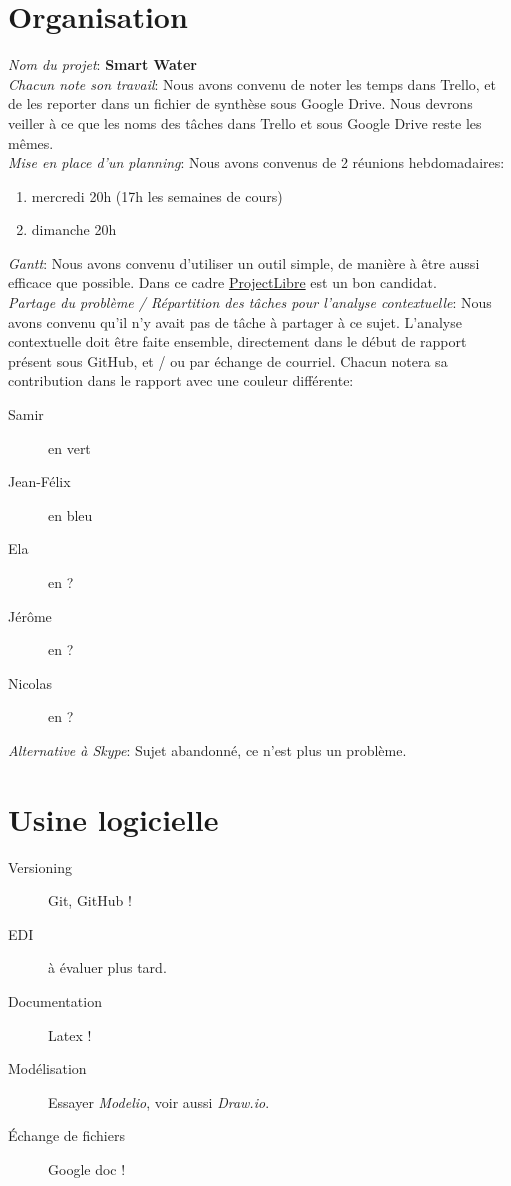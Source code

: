 \documentclass[11pt,a4paper,french,twoside,openright]{article}
\begin{document}
\section{Organisation}
\noindent
\emph{Nom du projet}: \textbf{Smart Water}\\
\emph{Chacun note son travail}: Nous avons convenu de noter les temps dans Trello, et de les reporter dans un fichier de synthèse sous Google Drive.
Nous devrons veiller à ce que les noms des tâches dans Trello et sous Google Drive reste les mêmes.\\
\emph{Mise en place d'un planning}: Nous avons convenus de 2 réunions hebdomadaires:
\begin{enumerate}
\item mercredi 20h (17h les semaines de cours)
\item dimanche 20h
\end{enumerate}
\emph{Gantt}: Nous avons convenu d'utiliser un outil simple, de manière à être aussi efficace que possible.
Dans ce cadre \href{http://www.projectlibre.com}{ProjectLibre} est un bon candidat.\\
\emph{Partage du problème / Répartition des tâches pour l'analyse contextuelle}: Nous avons convenu qu'il n'y avait pas de tâche à partager à ce sujet. L'analyse contextuelle doit être faite ensemble, directement dans le début de rapport présent sous GitHub, et / ou par échange de courriel. Chacun notera sa contribution dans le rapport avec une couleur différente:
  \begin{description}
  \item[Samir] en vert
  \item[Jean-Félix] en bleu
  \item[Ela] en ?
  \item[Jérôme] en ?
  \item[Nicolas] en ?
  \end{description}
\emph{Alternative à Skype}: Sujet abandonné, ce n'est plus un problème.

\section{Usine logicielle}
  \begin{description}
  \item[Versioning] Git, GitHub !
  \item[EDI] à évaluer plus tard.
  \item[Documentation] Latex !
  \item[Modélisation] Essayer \emph{Modelio}, voir aussi \emph{Draw.io}.
  \item[Échange de fichiers] Google doc !
  \end{description}
\end{document}
